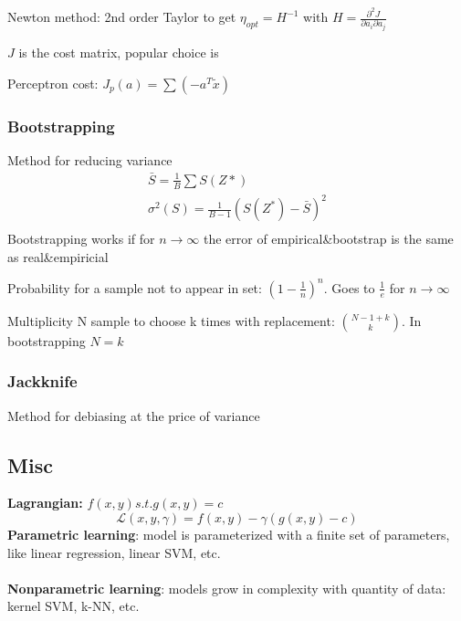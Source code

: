 \documentclass[main]{subfiles}
\begin{document}
\begin{landscape}
\begin{multicols}{4}
Newton method: 2nd order Taylor to get $\eta_{opt} = H^{-1}$ with $H=\frac{\partial^2 J}{\partial a_i \partial a_j}$

$J$ is the cost matrix, popular choice is

Perceptron cost: $J_p (a) = \sum(-a^T \widetilde{x})$
{\color{subsubsectionColor}\subsubsection{Bootstrapping}}
Method for reducing variance
\begin{eqnarray}
\bar{S} = \frac{1}{B}\sum S(Z*)\\
\sigma^2(S) = \frac{1}{B-1} (S(Z^*) - \bar{S})^2\\
\end{eqnarray}
Bootstrapping works if for $n \rightarrow \infty$ the error of empirical\&bootstrap is the same as real\&empiricial

Probability for a sample not to appear in set: $(1-\frac{1}{n})^n$. Goes to $\frac{1}{e}$ for $n \rightarrow \infty$

Multiplicity N sample to choose k times with replacement: $  N-1+k \choose k$. In bootstrapping $N=k$
{\color{subsubsectionColor}\subsubsection{Jackknife}}
Method for debiasing at the price of variance

{\color{subsectionColor}\subsection{Misc}}
\textbf{Lagrangian:} $f(x,y) s.t. g(x,y) = c$
\begin{equation}
\mathcal{L}(x, y, \gamma) = f(x,y) - \gamma ( g(x,y)-c)
\end{equation}
\textbf{Parametric learning}: model is parameterized with a finite set of parameters, like linear regression, linear SVM, etc. \\ \\
\textbf{Nonparametric learning}: models grow in complexity with quantity of data: kernel SVM, k-NN, etc.


\end{multicols}
\end{landscape}
\end{document}
